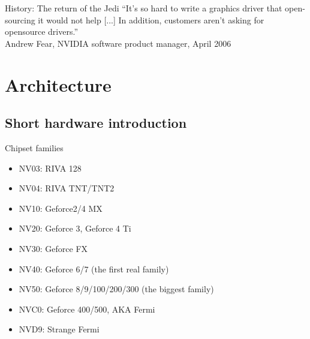 \documentclass[11pt,english,compress]{beamer}
\begin{document}
		\begin{frame}
			\begin{block}{History: The return of the Jedi}
				``It's so hard to write a graphics driver that open-sourcing it
				would not help [...] In addition, customers aren't asking for opensource drivers.''\\
				Andrew Fear, NVIDIA software product manager, April 2006
			\end{block}
		\end{frame}

\section{Architecture}
	\subsection{Short hardware introduction}
		\begin{frame}
			\begin{block}{Chipset families}
				\begin{itemize}
					\item NV03: RIVA 128
					\item NV04: RIVA TNT/TNT2
					\item NV10: Geforce2/4 MX
					\item NV20: Geforce 3, Geforce 4 Ti
					\item NV30: Geforce FX
					\item NV40: Geforce 6/7 (the first real family) 
					\item NV50: Geforce 8/9/100/200/300 (the biggest family)
					\item NVC0: Geforce 400/500, AKA Fermi
					\item NVD9: Strange Fermi
				\end{itemize}
			\end{block}
		\end{frame}
\end{document}

